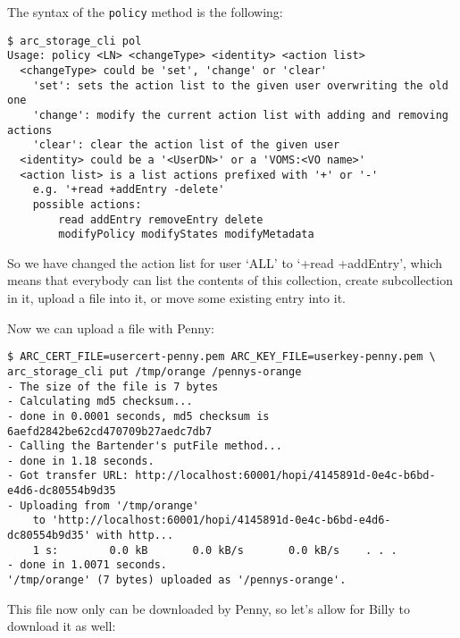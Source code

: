 \documentclass{book}
\begin{document}
The syntax of the \verb!policy! method is the following:

\begin{verbatim}
$ arc_storage_cli pol
Usage: policy <LN> <changeType> <identity> <action list>
  <changeType> could be 'set', 'change' or 'clear'
    'set': sets the action list to the given user overwriting the old one
    'change': modify the current action list with adding and removing actions
    'clear': clear the action list of the given user
  <identity> could be a '<UserDN>' or a 'VOMS:<VO name>'
  <action list> is a list actions prefixed with '+' or '-'
    e.g. '+read +addEntry -delete'
    possible actions:
        read addEntry removeEntry delete
        modifyPolicy modifyStates modifyMetadata
\end{verbatim}

So we have changed the action list for user `ALL' to `+read +addEntry', which means that everybody can list the contents of this collection, create subcollection in it, upload a file into it, or move some existing entry into it.

Now we can upload a file with Penny:

\begin{verbatim}
$ ARC_CERT_FILE=usercert-penny.pem ARC_KEY_FILE=userkey-penny.pem \
arc_storage_cli put /tmp/orange /pennys-orange
- The size of the file is 7 bytes
- Calculating md5 checksum...
- done in 0.0001 seconds, md5 checksum is 6aefd2842be62cd470709b27aedc7db7
- Calling the Bartender's putFile method...
- done in 1.18 seconds.
- Got transfer URL: http://localhost:60001/hopi/4145891d-0e4c-b6bd-e4d6-dc80554b9d35
- Uploading from '/tmp/orange'
    to 'http://localhost:60001/hopi/4145891d-0e4c-b6bd-e4d6-dc80554b9d35' with http...
    1 s:        0.0 kB       0.0 kB/s       0.0 kB/s    . . .       
- done in 1.0071 seconds.
'/tmp/orange' (7 bytes) uploaded as '/pennys-orange'.
\end{verbatim}

This file now only can be downloaded by Penny, so let's allow for Billy to download it as well:
\end{document}
